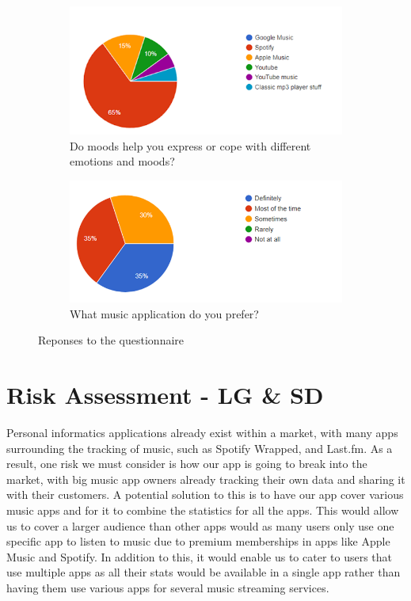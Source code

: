 \documentclass[11pt]{report}
\begin{document}
\begin{figure}[h]
\centering
\begin{subfigure}{\textwidth}
	\centering	
	\includegraphics[width=0.9\linewidth]{question-moods.png}
	\caption{Do moods help you express or cope with different emotions and moods?}
	\label{fig:question-moods}
\end{subfigure}
\begin{subfigure}{\textwidth}
	\centering
	\includegraphics[width=0.9\linewidth]{question-format.png}
	\caption{What music application do you prefer?}
	\label{fig:question-format}
\end{subfigure}

\caption{Reponses to the questionnaire}
\label{fig:question}

\end{figure}


\chapter{Risk Assessment - LG \& SD}
Personal informatics applications already exist within a market, with many apps surrounding the tracking of music, such as Spotify Wrapped, and Last.fm. As a result, one risk we must consider is how our app is going to break into the market, with big music app owners already tracking their own data and sharing it with their customers. A potential solution to this is to have our app cover various music apps and for it to combine the statistics for all the apps. This would allow us to cover a larger audience than other apps would as many users only use one specific app to listen to music due to premium memberships in apps like Apple Music and Spotify. In addition to this, it would enable us to cater to users that use multiple apps as all their stats would be available in a single app rather than having them use various apps for several music streaming services.
\end{document}
